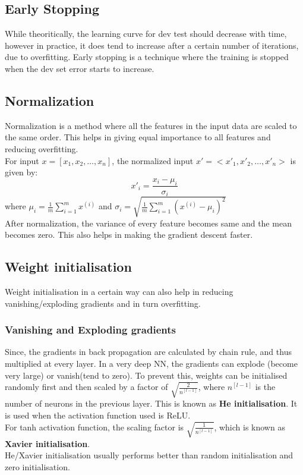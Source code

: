 \documentclass[12pt]{article}
\begin{document}
\subsection{Early Stopping}
While theoritically, the learning curve for dev test should decrease with time, however in practice, it does tend to increase after a certain number of iterations, due to overfitting. Early stopping is a technique where the training is stopped when the dev set error starts to increase. 
\newpage
\subsection{Normalization}
Normalization is a method where all the features in the input data are scaled to the same order. This helps in giving equal importance to all features and reducing overfitting.\\
For input $x=[x_1,x_2,\dots,x_n]$, the normalized input $x'=<x'_1,x'_2,\dots,x'_n>$ is given by:
\begin{equation}
    x'_i = \frac{x_i-\mu_i}{\sigma_i}
\end{equation}
where $\mu_i = \frac{1}{m} \sum_{i=1}^{m} x^{(i)}$ and $\sigma_i = \sqrt{\frac{1}{m} \sum_{i=1}^{m} (x^{(i)}-\mu_i)^2}$\\
After normalization, the variance of every feature becomes same and the mean becomes zero. This also helps in making the gradient descent faster.\\

\subsection{Weight initialisation}
Weight initialisation in a certain way can also help in reducing vanishing/exploding gradients and in turn overfitting.\\
\subsubsection*{Vanishing and Exploding gradients}
Since, the gradients in back propagation are calculated by chain rule, and thus multiplied at every layer. In a very deep NN, the gradients can explode (become very large) or vanish(tend to zero). 
To prevent this, weights can be initialised randomly first and then scaled by a factor of $\sqrt{\frac{2}{n^{[l-1]}}}$, where $n^{[l-1]}$ is the number of neurons in the previous layer. This is known as \textbf{He initialisation}. It is used when the activation function used is ReLU.\\
For tanh activation function, the scaling factor is $\sqrt{\frac{1}{n^{[l-1]}}}$, which is known as \textbf{Xavier initialisation}.\\
He/Xavier initialisation usually performs better than random initialisation and zero initialisation.\\
\end{document}
